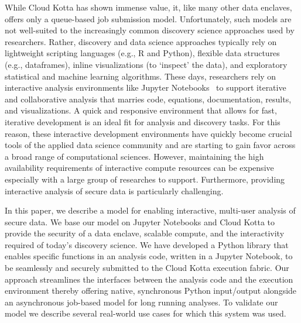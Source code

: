 While Cloud Kotta has shown immense value, it, like many
other data enclaves, offers only a queue-based job submission model. 
Unfortunately, such models are not well-suited to the increasingly
common discovery science approaches used by researchers. Rather, discovery and data science approaches typically rely on lightweight scripting languages (e.g., R and Python), 
flexible data structures (e.g., dataframes), inline visualizations (to `inspect' the data), 
and exploratory statistical and machine learning algorithms.
These days, researchers rely on interactive analysis environments like Jupyter Notebooks~\cite{jupyter} 
to support iterative and collaborative analysis that marries code, equations, documentation, 
results, and visualizations. A quick and responsive environment that allows for fast, iterative
development is an ideal fit for analysis and discovery tasks. For this reason, these interactive development environments have quickly become crucial tools of
the applied data science community and are starting to gain favor across a broad range of computational sciences. However, maintaining the
high availability requirements of interactive compute resources can be expensive especially
with a large group of researches to support. Furthermore, providing interactive analysis
of secure data is particularly challenging.

In this paper, we describe a model for enabling interactive, multi-user analysis 
of secure data. We base our model on Jupyter Notebooks and Cloud Kotta to provide the security of a data enclave, scalable compute, and the interactivity required of today's discovery science. 
We have developed a Python library that enables specific functions in an analysis code, written in 
a Jupyter Notebook, to be seamlessly and securely submitted
to the Cloud Kotta execution fabric. Our approach streamlines
the interfaces between the analysis code and the execution
environment thereby offering native, synchronous Python input/output
alongside an asynchronous job-based model for long running analyses. 
To validate our model we describe several real-world use cases 
for which this system was used. 